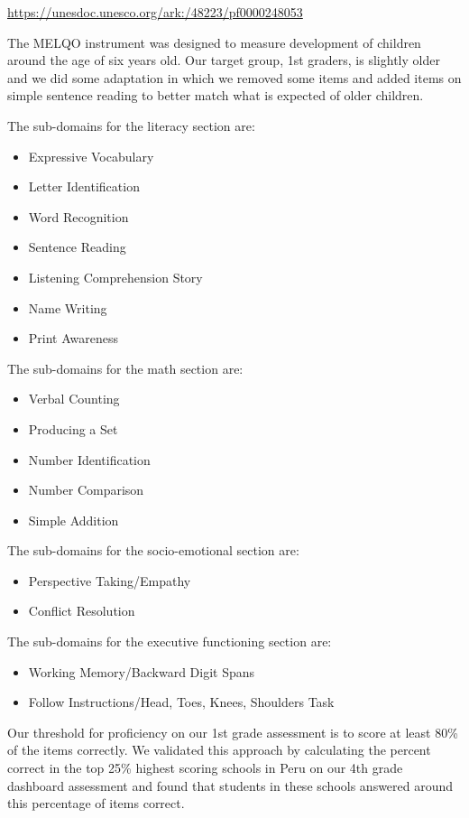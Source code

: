 \documentclass[]{article}
\providecommand{\tightlist}{%
  \setlength{\itemsep}{0pt}\setlength{\parskip}{0pt}}
\begin{document}
\url{https://unesdoc.unesco.org/ark:/48223/pf0000248053}

The MELQO instrument was designed to measure development of children
around the age of six years old. Our target group, 1st graders, is
slightly older and we did some adaptation in which we removed some items
and added items on simple sentence reading to better match what is
expected of older children.

The sub-domains for the literacy section are:

\begin{itemize}
\tightlist
\item
  Expressive Vocabulary
\item
  Letter Identification
\item
  Word Recognition
\item
  Sentence Reading
\item
  Listening Comprehension Story
\item
  Name Writing
\item
  Print Awareness
\end{itemize}

The sub-domains for the math section are:

\begin{itemize}
\tightlist
\item
  Verbal Counting
\item
  Producing a Set
\item
  Number Identification
\item
  Number Comparison
\item
  Simple Addition
\end{itemize}

The sub-domains for the socio-emotional section are:

\begin{itemize}
\tightlist
\item
  Perspective Taking/Empathy
\item
  Conflict Resolution
\end{itemize}

The sub-domains for the executive functioning section are:

\begin{itemize}
\tightlist
\item
  Working Memory/Backward Digit Spans
\item
  Follow Instructions/Head, Toes, Knees, Shoulders Task
\end{itemize}

Our threshold for proficiency on our 1st grade assessment is to score at
least 80\% of the items correctly. We validated this approach by
calculating the percent correct in the top 25\% highest scoring schools
in Peru on our 4th grade dashboard assessment and found that students in
these schools answered around this percentage of items correct.
\end{document}
